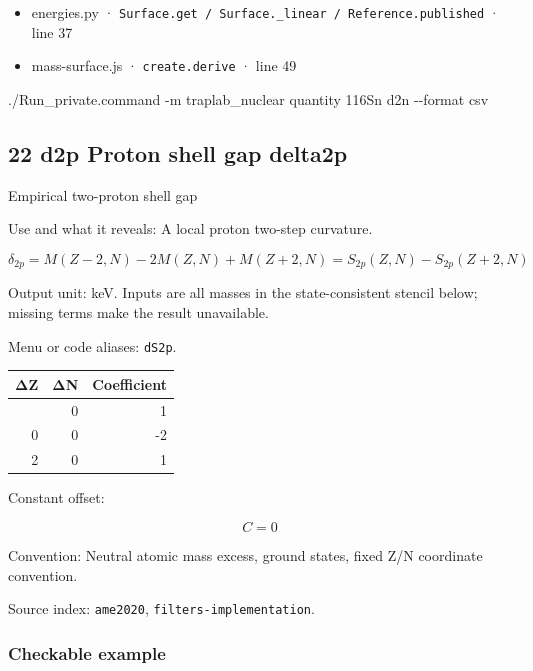 \documentclass[
  11pt,
  letterpaper,
]{article}
\newenvironment{Shaded}{}{}
\newcommand{\AttributeTok}[1]{\textcolor[rgb]{0.49,0.56,0.16}{#1}}
\newcommand{\ExtensionTok}[1]{#1}
\newcommand{\NormalTok}[1]{#1}
\providecommand{\tightlist}{%
  \setlength{\itemsep}{0pt}\setlength{\parskip}{0pt}}
\begin{document}
\begin{itemize}
\tightlist
\item
  energies.py ·
  \texttt{Surface.get\ /\ Surface.\_linear\ /\ Reference.published} ·
  line 37
\item
  mass-surface.js · \texttt{create.derive} · line 49
\end{itemize}

\begin{Shaded}
\begin{Highlighting}[]
\ExtensionTok{./Run\_private.command} \AttributeTok{{-}m}\NormalTok{ traplab\_nuclear quantity 116Sn d2n }\AttributeTok{{-}{-}format}\NormalTok{ csv}
\end{Highlighting}
\end{Shaded}

\subsection{22 d2p Proton shell gap
delta2p}\label{d2p-proton-shell-gap-delta2p}

Empirical two-proton shell gap

Use and what it reveals: A local proton two-step curvature.

\[
\delta_{2p}=M(Z-2,N)-2M(Z,N)+M(Z+2,N)=S_{2p}(Z,N)-S_{2p}(Z+2,N)
\]

Output unit: keV. Inputs are all masses in the state-consistent stencil
below; missing terms make the result unavailable.

Menu or code aliases: \texttt{dS2p}.

\begin{longtable}[]{@{}rrr@{}}
\toprule\noalign{}
ΔZ & ΔN & Coefficient \\
\midrule\noalign{}
\endhead
\bottomrule\noalign{}
\endlastfoot
-2 & 0 & 1 \\
0 & 0 & -2 \\
2 & 0 & 1 \\
\end{longtable}

Constant offset:

\[
C=0
\]

Convention: Neutral atomic mass excess, ground states, fixed Z/N
coordinate convention.

Source index: \texttt{ame2020}, \texttt{filters-implementation}.

\subsubsection{Checkable example}\label{checkable-example-21}
\end{document}
